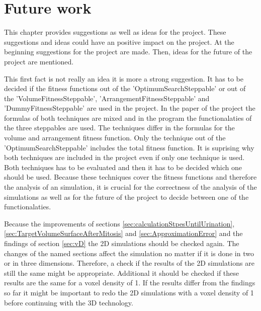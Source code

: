 \chapter{Future work}
This chapter provides suggestions as well as ideas for the project. These suggestions and ideas could have an positive impact on the project. At the beginning suggestions for the project are made. Then, ideas for the future of the project are mentioned.


This first fact is not really an idea it is more a strong suggestion. It has to be decided if the fitness functions out of the 'OptimumSearchSteppable' or out of the 'VolumeFitnessSteppable', 'ArrangementFitnessSteppable' and 'DummyFitnessSteppable' are used in the project. In the paper of the project \cite{Torelli2017} the formulas of both techniques are mixed and in the program the functionalaties of the three steppables are used. The techniques differ in the formulas for the volume and arrangement fitness function. Only the technique out of the 'OptimumSearchSteppable' includes the total fitness function. It is suprising why both techniques are included in the project even if only one technique is used. \newline
Both techniques has to be evaluated and then it has to be decided which one should be used. Because these techniques cover the fitness functions and therefore the analysis of an simulation, it is crucial for the correctness of the analysis of the simulations as well as for the future of the project to decide between one of the functionalaties.

Because the improvements of sections \ref{sec:calculationStpesUntilUrination}, \ref{sec:TargetVolumeSurfaceAfterMitosis} and \ref{sec:ApproximationError} and the findings of section \ref{sec:vD} the 2D simulations should be checked again. The changes of the named sections affect the simulation no matter if it is done in two or in three dimensions. Therefore, a check if the results of the 2D simulations are still the same might be appropriate. Additional it should be checked if these results are the same for a voxel density of 1. If the results differ from the findings so far it might be important to redo the 2D simulations with a voxel density of 1 before continuing with the 3D technology.



